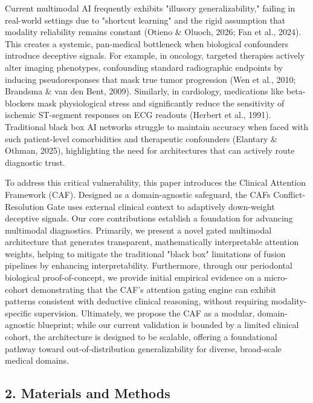 \documentclass[
]{article}
\begin{document}
Current multimodal AI frequently exhibits "illusory generalizability,"
failing in real-world settings due to "shortcut learning" and the rigid
assumption that modality reliability remains constant (Otieno \& Oluoch,
2026; Fan et al., 2024). This creates a systemic, pan-medical bottleneck
when biological confounders introduce deceptive signals. For example, in
oncology, targeted therapies actively alter imaging phenotypes,
confounding standard radiographic endpoints by inducing pseudoresponses
that mask true tumor progression (Wen et al., 2010; Brandsma \& van den
Bent, 2009). Similarly, in cardiology, medications like beta-blockers
mask physiological stress and significantly reduce the sensitivity of
ischemic ST-segment responses on ECG readouts (Herbert et al., 1991).
Traditional \textquotesingle black box\textquotesingle{} AI networks
struggle to maintain accuracy when faced with such patient-level
comorbidities and therapeutic confounders (Elantary \& Othman, 2025),
highlighting the need for architectures that can actively route
diagnostic trust.

To address this critical vulnerability, this paper introduces the
Clinical Attention Framework (CAF). Designed as a domain-agnostic
safeguard, the CAF\textquotesingle s Conflict-Resolution Gate uses
external clinical context to adaptively down-weight deceptive signals.
Our core contributions establish a foundation for advancing multimodal
diagnostics. Primarily, we present a novel gated multimodal architecture
that generates transparent, mathematically interpretable attention
weights, helping to mitigate the traditional "black box" limitations of
fusion pipelines by enhancing interpretability. Furthermore, through our
periodontal biological proof-of-concept, we provide initial empirical
evidence on a micro-cohort demonstrating that the CAF's attention gating
engine can exhibit patterns consistent with deductive clinical
reasoning, without requiring modality-specific supervision. Ultimately,
we propose the CAF as a modular, domain-agnostic blueprint; while our
current validation is bounded by a limited clinical cohort, the
architecture is designed to be scalable, offering a foundational pathway
toward out-of-distribution generalizability for diverse, broad-scale
medical domains.

\subsection{\texorpdfstring{\textbf{2. Materials and
Methods}}{2. Materials and Methods}}\label{materials-and-methods}
\end{document}
